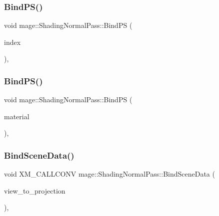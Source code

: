 \subsubsection{\texorpdfstring{Bind\+P\+S()}{BindPS()}\hspace{0.1cm}{\footnotesize\ttfamily [1/2]}}
{\footnotesize\ttfamily void mage\+::\+Shading\+Normal\+Pass\+::\+Bind\+PS (\begin{DoxyParamCaption}\item[{\hyperlink{classmage_1_1_shading_normal_pass_a6d277753d26a7854c448b3e0d9275b19}{P\+S\+Index}}]{index }\end{DoxyParamCaption})\hspace{0.3cm}{\ttfamily [private]}, {\ttfamily [noexcept]}}

\hypertarget{classmage_1_1_shading_normal_pass_af8ef8987bda86646712780b5cfad0b72}{}\label{classmage_1_1_shading_normal_pass_af8ef8987bda86646712780b5cfad0b72} 
\subsubsection{\texorpdfstring{Bind\+P\+S()}{BindPS()}\hspace{0.1cm}{\footnotesize\ttfamily [2/2]}}
{\footnotesize\ttfamily void mage\+::\+Shading\+Normal\+Pass\+::\+Bind\+PS (\begin{DoxyParamCaption}\item[{const \hyperlink{structmage_1_1_material}{Material} $\ast$}]{material }\end{DoxyParamCaption})\hspace{0.3cm}{\ttfamily [private]}, {\ttfamily [noexcept]}}

\hypertarget{classmage_1_1_shading_normal_pass_a738ec6bb32a6ba30265010d971c8c0cf}{}\label{classmage_1_1_shading_normal_pass_a738ec6bb32a6ba30265010d971c8c0cf} 
\subsubsection{\texorpdfstring{Bind\+Scene\+Data()}{BindSceneData()}}
{\footnotesize\ttfamily void X\+M\+\_\+\+C\+A\+L\+L\+C\+O\+NV mage\+::\+Shading\+Normal\+Pass\+::\+Bind\+Scene\+Data (\begin{DoxyParamCaption}\item[{F\+X\+M\+M\+A\+T\+R\+IX}]{view\+\_\+to\+\_\+projection }\end{DoxyParamCaption})\hspace{0.3cm}{\ttfamily [private]}, {\ttfamily [noexcept]}}

